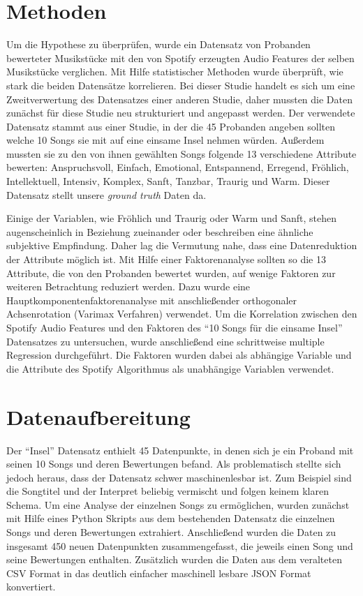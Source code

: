 \section*{Methoden}
\label{sec:Methoden}

Um die Hypothese zu überprüfen,
wurde ein Datensatz von Probanden bewerteter Musikstücke mit den von Spotify erzeugten Audio Features der selben Musikstücke verglichen.
Mit Hilfe statistischer Methoden wurde überprüft, wie stark die beiden Datensätze korrelieren.
Bei dieser Studie handelt es sich um eine Zweitverwertung des Datensatzes einer anderen Studie, daher mussten die Daten zunächst für diese Studie neu strukturiert und angepasst werden.
Der verwendete Datensatz stammt aus einer Studie, in der die 45 Probanden angeben sollten welche 10 Songs sie mit auf eine einsame Insel nehmen würden.
Außerdem mussten sie zu den von ihnen gewählten Songs folgende 13 verschiedene Attribute bewerten: Anspruchsvoll, Einfach, Emotional, Entspannend, Erregend, Fröhlich, Intellektuell, Intensiv, Komplex, Sanft, Tanzbar, Traurig und Warm.
Dieser Datensatz stellt unsere \textit{ground truth} Daten da.

Einige der Variablen, wie Fröhlich und Traurig oder Warm und Sanft, stehen augenscheinlich in Beziehung zueinander oder beschreiben eine ähnliche subjektive Empfindung.
Daher lag die Vermutung nahe, dass eine Datenreduktion der Attribute möglich ist.
Mit Hilfe einer Faktorenanalyse sollten so die 13 Attribute, die von den Probanden bewertet wurden, auf wenige Faktoren zur weiteren Betrachtung reduziert werden.
Dazu wurde eine Hauptkomponentenfaktorenanalyse mit anschließender orthogonaler Achsenrotation (Varimax Verfahren) verwendet.
Um die Korrelation zwischen den Spotify Audio Features und den Faktoren des "`10 Songs für die einsame Insel"' Datensatzes zu untersuchen, wurde anschließend eine schrittweise multiple Regression durchgeführt.
Die Faktoren wurden dabei als abhängige Variable und die Attribute des Spotify Algorithmus als unabhängige Variablen verwendet.



\section*{Datenaufbereitung}
\label{sec:Datenaufbereitung}


Der "`Insel"' Datensatz enthielt 45 Datenpunkte, in denen sich je ein Proband mit seinen 10 Songs und deren Bewertungen befand.
Als problematisch stellte sich jedoch heraus, dass der Datensatz schwer maschinenlesbar ist. 
Zum Beispiel sind die Songtitel und der Interpret beliebig vermischt und folgen keinem klaren Schema.
Um eine Analyse der einzelnen Songs zu ermöglichen, wurden zunächst mit Hilfe eines Python Skripts aus dem bestehenden Datensatz die einzelnen Songs und deren Bewertungen extrahiert.
Anschließend wurden die Daten zu insgesamt 450 neuen Datenpunkten zusammengefasst, die jeweils einen Song und seine Bewertungen enthalten.
Zusätzlich wurden die Daten aus dem veralteten CSV Format in das deutlich einfacher maschinell lesbare JSON Format konvertiert.

